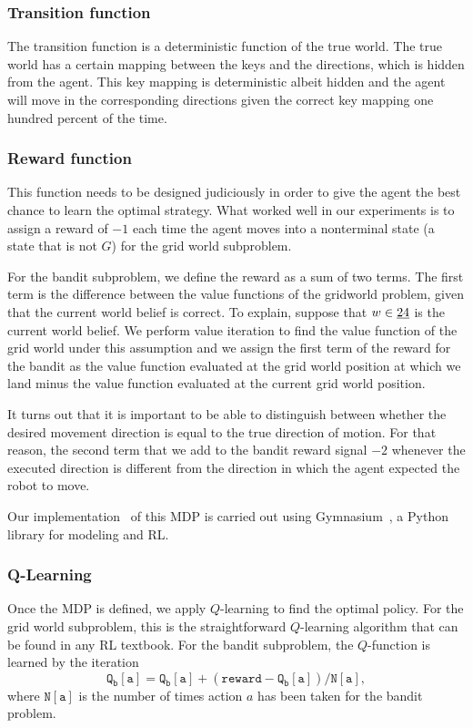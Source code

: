 \subsubsection{Transition function}
%
The transition function is a deterministic function of the true world. The true 
world has a certain mapping between the keys and the directions, which is hidden
from the agent. This key mapping is deterministic albeit hidden and the agent
will move in the corresponding directions given the correct key mapping one
hundred percent of the time.

\subsubsection{Reward function}
%
This function needs to be designed judiciously in order to give the agent the
best chance to learn the optimal strategy. What worked well in our experiments
is to assign a reward of $-1$ each time the agent moves into a nonterminal state
(a state that is not $G$) for the grid world subproblem. 

For the bandit subproblem, we define the reward as a sum of two terms. The first
term is the difference between the value functions of the gridworld problem,
given that the current world belief is correct. To explain, suppose that $w \in
\uline{24}$ is the current world belief. We perform value iteration to find the
value function of the grid world under this assumption and we assign the first
term of the reward for the bandit as the value function evaluated at the grid
world position at which we land minus the value function evaluated at the
current grid world position.

It turns out that it is important to be able to distinguish between whether the 
desired movement direction is equal to the true direction of motion. For that 
reason, the second term that we add to the bandit reward signal $-2$ whenever
the executed direction is different from the direction in which the agent
expected the robot to move.

Our implementation~\cite{saticiGitHub} of this MDP is carried out using 
Gymnasium~\cite{towers2024gymnasium}, a Python library for modeling and RL.


\subsubsection{Q-Learning}

Once the MDP is defined, we apply $Q$-learning to find the optimal policy. For 
the grid world subproblem, this is the straightforward $Q$-learning algorithm 
that can be found in any RL textbook. For the bandit subproblem, the $Q$-function is learned by the iteration
%
\[
\mathtt{
Q_b[a] = Q_b[a] + (reward - Q_b[a]) / N[a],
}
\]
%
where $\mathtt{N[a]}$ is the number of times action $a$ has been taken for the 
bandit problem.

